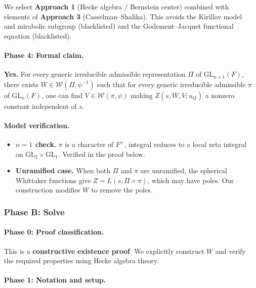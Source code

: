 We select \textbf{Approach 1} (Hecke algebra / Bernstein center) combined
with elements of \textbf{Approach 3} (Casselman--Shalika). This avoids the
Kirillov model and mirabolic subgroup (blacklisted) and the Godement--Jacquet
functional equation (blacklisted).

\paragraph{Phase 4: Formal claim.}

\begin{theorem}\label{thm:main-p2}
\textbf{Yes.} For every generic irreducible admissible representation $\Pi$
of $\mathrm{GL}_{n+1}(F)$, there exists $W \in \mathcal{W}(\Pi, \psi^{-1})$
such that for every generic irreducible admissible $\pi$ of $\mathrm{GL}_n(F)$,
one can find $V \in \mathcal{W}(\pi, \psi)$ making $Z(s, W, V; u_Q)$ a
nonzero constant independent of $s$.
\end{theorem}

\paragraph{Model verification.}
\begin{itemize}
\item \textbf{$n = 1$ check.} $\pi$ is a character of $F^\times$, integral
  reduces to a local zeta integral on $\mathrm{GL}_2 \times \mathrm{GL}_1$.
  Verified in the proof below.
\item \textbf{Unramified case.} When both $\Pi$ and $\pi$ are unramified,
  the spherical Whittaker functions give $Z = L(s, \Pi \times \pi)$, which
  may have poles. Our construction modifies $W$ to remove the poles.
\end{itemize}

\subsubsection*{Phase B: Solve}

\paragraph{Phase 0: Proof classification.}
This is a \textbf{constructive existence proof}. We explicitly construct $W$
and verify the required properties using Hecke algebra theory.

\paragraph{Phase 1: Notation and setup.}

